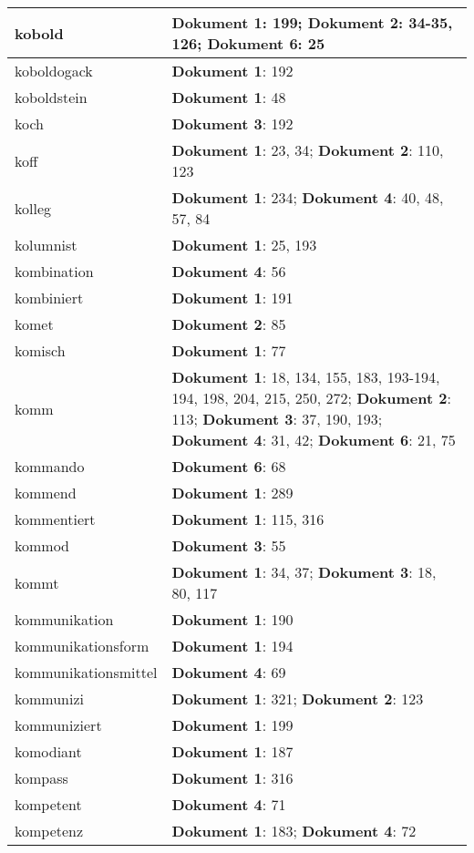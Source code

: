 \documentclass[a5paper]{article}
\begin{document}
\begin{longtable}[l]{|l|p{3in}|}
\hline
kobold & \textbf{Dokument 1}: 199; \textbf{Dokument 2}: 34-35, 126; \textbf{Dokument 6}: 25 \\
\hline
koboldogack & \textbf{Dokument 1}: 192 \\
\hline
koboldstein & \textbf{Dokument 1}: 48 \\
\hline
koch & \textbf{Dokument 3}: 192 \\
\hline
koff & \textbf{Dokument 1}: 23, 34; \textbf{Dokument 2}: 110, 123 \\
\hline
kolleg & \textbf{Dokument 1}: 234; \textbf{Dokument 4}: 40, 48, 57, 84 \\
\hline
kolumnist & \textbf{Dokument 1}: 25, 193 \\
\hline
kombination & \textbf{Dokument 4}: 56 \\
\hline
kombiniert & \textbf{Dokument 1}: 191 \\
\hline
komet & \textbf{Dokument 2}: 85 \\
\hline
komisch & \textbf{Dokument 1}: 77 \\
\hline
komm & \textbf{Dokument 1}: 18, 134, 155, 183, 193-194, 194, 198, 204, 215, 250, 272; \textbf{Dokument 2}: 113; \textbf{Dokument 3}: 37, 190, 193; \textbf{Dokument 4}: 31, 42; \textbf{Dokument 6}: 21, 75 \\
\hline
kommando & \textbf{Dokument 6}: 68 \\
\hline
kommend & \textbf{Dokument 1}: 289 \\
\hline
kommentiert & \textbf{Dokument 1}: 115, 316 \\
\hline
kommod & \textbf{Dokument 3}: 55 \\
\hline
kommt & \textbf{Dokument 1}: 34, 37; \textbf{Dokument 3}: 18, 80, 117 \\
\hline
kommunikation & \textbf{Dokument 1}: 190 \\
\hline
kommunikationsform & \textbf{Dokument 1}: 194 \\
\hline
kommunikationsmittel & \textbf{Dokument 4}: 69 \\
\hline
kommunizi & \textbf{Dokument 1}: 321; \textbf{Dokument 2}: 123 \\
\hline
kommuniziert & \textbf{Dokument 1}: 199 \\
\hline
komodiant & \textbf{Dokument 1}: 187 \\
\hline
kompass & \textbf{Dokument 1}: 316 \\
\hline
kompetent & \textbf{Dokument 4}: 71 \\
\hline
kompetenz & \textbf{Dokument 1}: 183; \textbf{Dokument 4}: 72 \\

\end{longtable}
\end{document}
